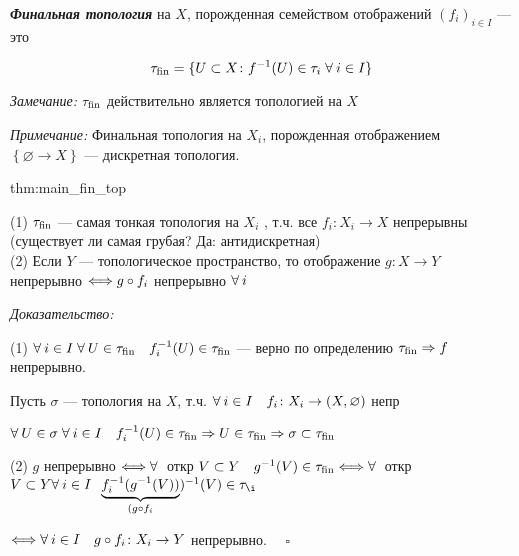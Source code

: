 \documentclass[../../main.tex]{subfiles}
\begin{document}
 \textbf{\textit{Финальная топология}} на $X$, порожденная семейством отображений $(f_i)_{i \in I}$ — это 

$$\tau_{\operatorname{fin}} = \lbrace U \subset X \colon f^{-1}(U) \in \tau_i \; \forall\: i \in I \rbrace$$

\textit{Замечание:} $\tau_{\operatorname{fin}}$ действительно является топологией на $X$

\textit{Примечание:} Финальная топология на $X_i$, порожденная отображением $\left\{ \varnothing \to X \right\}$ — дискретная топология.

\begin{theo}{thm:main_fin_top}

(1) $\tau_{\operatorname{fin}}$ — самая тонкая топология на $X_i$ , т.ч. все $f_i \colon X_i \to X$ непрерывны
(существует ли самая грубая? Да: антидискретная)\\
(2) Если $Y$ — топологическое пространство, то отображение $g \colon X \to Y$ непрерывно $\Longleftrightarrow g\circ f_i$ непрерывно $\forall\: i$
\end{theo}
\begin{minipage}{0.15\linewidth}
\end{minipage}
\begin{minipage}{0.85\linewidth}
\textit{Доказательство:} 

(1) $\forall\: i \in I \; \forall\: U \in \tau_{\operatorname{fin}} \quad f^{-1}_i(U) \in \tau_{\operatorname{fin}}$ — верно по определению $\tau_{\operatorname{fin}} \Rightarrow f$ непрерывно.

Пусть $\sigma$ — топология на $X$, т.ч. $\forall\: i \in I \quad f_i \colon X_i \to (X, \varnothing)$ непр

$\forall\: U \in \sigma \; \forall\: i \in I \quad f^{-1}_i(U) \in \tau_{\operatorname{fin}} \Rightarrow U \in \tau_{\operatorname{fin}} \Rightarrow \sigma \subset \tau_{\operatorname{fin}}$

(2) $g$ непрерывно $\Longleftrightarrow \forall\:$ откр $V \subset Y \quad g^{-1}(V) \in \tau_{\operatorname{fin}} \Longleftrightarrow \forall\:$ откр $V \subset Y \fo i \in I \;\; \underbrace{f^{-1}_i (g^{-1}(V))}_{(g \circ f_i})^{-1} (V) \in \tau_{\i}$

$\Longleftrightarrow  \forall\: i \in I \quad g \circ f_i \colon X_i \to Y$ непрерывно. $\quad \square$
\end{minipage}
\end{document}
